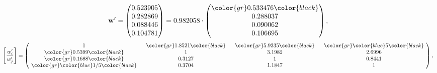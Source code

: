 \begin{example}
\begin{equation*}
\mathbf{w}^{\prime} =
\begin{pmatrix}
0.523905\\
0.282869\\
0.088446\\
0.104781
\end{pmatrix} =
0.982058\cdot
\begin{pmatrix}
\color{gr} 0.533476\color{black} \\
0.288037\\
0.090062\\
0.106695
\end{pmatrix},
\end{equation*}
\begin{equation*}
\left[ \frac{{w}^{\prime}_i}{{w}^{\prime}_j} \right] =
\begin{pmatrix}
$\,\,$ 1 $\,\,$ & $\,\,$\color{gr} 1.8521\color{black} $\,\,$ & $\,\,$\color{gr} 5.9235\color{black} $\,\,$ & $\,\,$\color{gr} \color{blue} 5\color{black} $\,\,$ \\
$\,\,$\color{gr} 0.5399\color{black} $\,\,$ & $\,\,$ 1 $\,\,$ & $\,\,$3.1982$\,\,$ & $\,\,$2.6996  $\,\,$ \\
$\,\,$\color{gr} 0.1688\color{black} $\,\,$ & $\,\,$0.3127$\,\,$ & $\,\,$ 1 $\,\,$ & $\,\,$0.8441 $\,\,$ \\
$\,\,$\color{gr} \color{blue}  1/5\color{black} $\,\,$ & $\,\,$0.3704$\,\,$ & $\,\,$1.1847$\,\,$ & $\,\,$ 1  $\,\,$ \\
\end{pmatrix},
\end{equation*}
\end{example}
\newpage
